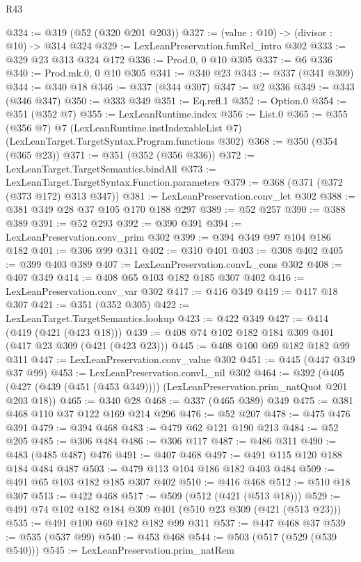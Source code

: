 \begin{lexlean}{R43}
\begin{coremodule}
@324 := @319 (@52 (@320 @201 @203))
@327 := (value : @10) -> (divisor : @10) -> @314 @324
@329 := LexLeanPreservation.funRel_intro @302
@333 := @329 @23 @313 @324 @172
@336 := Prod.{0, 0} @10 @305
@337 := @6 @336
@340 := Prod.mk.{0, 0} @10 @305
@341 := @340 @23
@343 := @337 (@341 @309)
@344 := @340 @18
@346 := @337 (@344 @307)
@347 := @2 @336
@349 := @343 (@346 @347)
@350 := @333 @349
@351 := Eq.refl.{1}
@352 := Option.{0}
@354 := @351 (@352 @7)
@355 := LexLeanRuntime.index
@356 := List.{0}
@365 := @355
    (@356 @7)
    @7
    (LexLeanRuntime.instIndexableList @7)
    (LexLeanTarget.TargetSyntax.Program.functions @302)
@368 := @350 (@354 (@365 @23))
@371 := @351 (@352 (@356 @336))
@372 := LexLeanTarget.TargetSemantics.bindAll
@373 := LexLeanTarget.TargetSyntax.Function.parameters
@379 := @368 (@371 (@372 (@373 @172) @313 @347))
@381 := LexLeanPreservation.conv_let @302
@388 := @381 @349 @28 @37 @105 @170 @188 @297
@389 := @52 @257
@390 := @388 @389
@391 := @52 @293
@392 := @390 @391
@394 := LexLeanPreservation.conv_prim @302
@399 := @394 @349 @97 @104 @186 @182
@401 := @306 @99 @311
@402 := @310 @401
@403 := @308 @402
@405 := @399 @403 @389
@407 := LexLeanPreservation.convL_cons @302
@408 := @407 @349
@414 := @408 @65 @103 @182 @185 @307 @402
@416 := LexLeanPreservation.conv_var @302
@417 := @416 @349
@419 := @417 @18 @307
@421 := @351 (@352 @305)
@422 := LexLeanTarget.TargetSemantics.lookup
@423 := @422 @349
@427 := @414 (@419 (@421 (@423 @18)))
@439 := @408 @74 @102 @182 @184 @309 @401 (@417 @23 @309 (@421 (@423 @23)))
@445 := @408 @100 @69 @182 @182 @99 @311
@447 := LexLeanPreservation.conv_value @302
@451 := @445 (@447 @349 @37 @99)
@453 := LexLeanPreservation.convL_nil @302
@464 := @392
    (@405 (@427 (@439 (@451 (@453 @349)))) (LexLeanPreservation.prim_natQuot @201 @203 @18))
@465 := @340 @28
@468 := @337 (@465 @389) @349
@475 := @381 @468 @110 @37 @122 @169 @214 @296
@476 := @52 @207
@478 := @475 @476 @391
@479 := @394 @468
@483 := @479 @62 @121 @190 @213
@484 := @52 @205
@485 := @306 @484
@486 := @306 @117
@487 := @486 @311
@490 := @483 (@485 @487) @476
@491 := @407 @468
@497 := @491 @115 @120 @188 @184 @484 @487
@503 := @479 @113 @104 @186 @182 @403 @484
@509 := @491 @65 @103 @182 @185 @307 @402
@510 := @416 @468
@512 := @510 @18 @307
@513 := @422 @468
@517 := @509 (@512 (@421 (@513 @18)))
@529 := @491 @74 @102 @182 @184 @309 @401 (@510 @23 @309 (@421 (@513 @23)))
@535 := @491 @100 @69 @182 @182 @99 @311
@537 := @447 @468 @37
@539 := @535 (@537 @99)
@540 := @453 @468
@544 := @503 (@517 (@529 (@539 @540)))
@545 := LexLeanPreservation.prim_natRem

\end{coremodule}
\end{lexlean}
